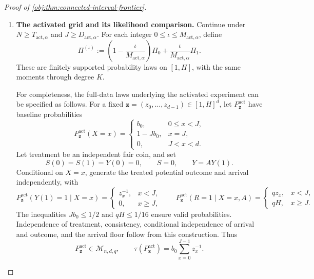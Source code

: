 \documentclass[11pt]{article}
\begin{document}
\begin{proof}[Proof of \cref{obj:thm:connected-interval-frontier}]
\begin{enumerate}
Suppose first that \(N\ge T_{\mathrm{act},\alpha}\). Since \(\ell\ge1\),
\[
D_{\mathrm{act},\alpha}
\le \frac{N}{2\eta}
\le \frac{N\ell}{2\eta}
=\frac1{2b_0}.
\]
Also,
\[
b_0\le\frac{\eta}{N}\le\frac14,\qquad
\ell\ge2,\qquad K\ge2.
\]
The ceiling bound \(K\le\ell+1\le2\ell\), together with the slice restriction,
gives
\[
qH=qK^2\le4q\ell^2\le\frac1{16}.
\]
By \cref{obj:lem:moment-matched-reciprocal-priors}, choose finitely supported
probability laws \(\Pi_0,\Pi_1\) on \([1,H]\) with matching moments through
degree \(K\). Interchange their names if necessary and define
\[
\mu_{\mathrm{rec},i}:=\int z^{-1}\,d\Pi_i(z)
\quad(i=0,1).
\]
Then
\[
\int z^v\,d\Pi_0(z)=\int z^v\,d\Pi_1(z)
\quad(0\le v\le K),
\qquad
\mu_{\mathrm{rec},1}-\mu_{\mathrm{rec},0}\ge\frac1{12}.
\]

We will show that whenever \(J\ge D_{\mathrm{act},\alpha}\),
\[
c_{\mathrm{act},\alpha}s_{\mathrm{many}}
\le\mathfrak L_{n,d,q,\alpha}.
\]

\item \textbf{The activated grid and its likelihood comparison.}
Continue under
\(N\ge T_{\mathrm{act},\alpha}\) and \(J\ge D_{\mathrm{act},\alpha}\).
For each integer \(0\le\iota\le M_{\mathrm{act},\alpha}\), define
\[
\Pi^{(\iota)}
:=
\left(1-\frac{\iota}{M_{\mathrm{act},\alpha}}\right)\Pi_0
+\frac{\iota}{M_{\mathrm{act},\alpha}}\Pi_1.
\]
These are finitely supported probability laws on \([1,H]\), with the same
moments through degree \(K\).

For completeness, the full-data laws underlying the activated experiment
can be specified as follows. For a fixed
\(\mathbf z=(z_0,\ldots,z_{d-1})\in[1,H]^d\), let
\(P^{\mathrm{act}}_{\mathbf z}\) have baseline probabilities
\[
P^{\mathrm{act}}_{\mathbf z}(X=x)
=
\begin{cases}
b_0,&0\le x<J,\\
1-Jb_0,&x=J,\\
0,&J<x<d.
\end{cases}
\]
Let treatment be an independent fair coin, and set
\[
S(0)=S(1)=Y(0)=0,\qquad S=0,\qquad Y=AY(1).
\]
Conditional on \(X=x\), generate the treated potential outcome and arrival
independently, with
\[
P^{\mathrm{act}}_{\mathbf z}(Y(1)=1\mid X=x)
=
\begin{cases}
z_x^{-1},&x<J,\\
0,&x\ge J,
\end{cases}
\qquad
P^{\mathrm{act}}_{\mathbf z}(R=1\mid X=x,A)
=
\begin{cases}
qz_x,&x<J,\\
qH,&x\ge J.
\end{cases}
\]
The inequalities \(Jb_0\le1/2\) and \(qH\le1/16\) ensure valid
probabilities. Independence of treatment, consistency, conditional
independence of arrival and outcome, and the arrival floor follow from
this construction. Thus
\[
P^{\mathrm{act}}_{\mathbf z}\in\mathcal M_{n,d,q},
\qquad
\tau(P^{\mathrm{act}}_{\mathbf z})
=b_0\sum_{x=0}^{J-1}z_x^{-1}.
\]


\end{enumerate}
\end{proof}
\end{document}
